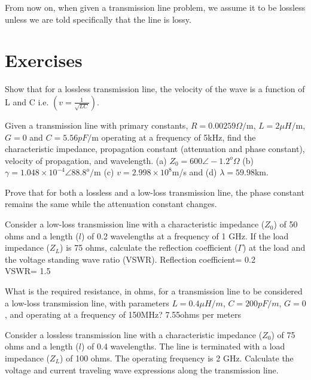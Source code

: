 From now on, when given a transmission line problem, we assume it to be lossless unless we are told specifically that the line is lossy.

\section*{Exercises}
\begin{ExerciseList}
\Exercise[label={ex41}]
Show that for a lossless transmission line, the velocity of the wave is a function of L and C i.e. $\left(v = \frac{1}{\sqrt{LC}}\right)$.

\Exercise[label={ex42}]
Given a transmission line with primary constants, $R = 0.00259\varOmega/$m, $L = 2\mu H/$m, $G = 0$ and $C = 5.56pF/$m operating at a frequency of 5kHz, find the characteristic impedance, propagation constant (attenuation and phase constant), velocity of propagation, and wavelength.
\Answer[ref={ex42}]
(a) $Z_0 = 600\angle-1.2^o\varOmega$ (b) $\gamma = 1.048\times10^{-4}\angle88.8^o/$m (c) $v = 2.998\times10^8$m/s and (d) $\lambda = 59.98$km.

\Exercise[label={ex43}]
Prove that for both a lossless and a low-loss transmission line, the phase constant remains the same while the attenuation constant changes.

\Exercise[label={ex44}]
Consider a low-loss transmission line with a characteristic impedance ($Z_0$) of 50 ohms and a length ($l$) of 0.2 wavelengths at a frequency of 1 GHz. If the load impedance ($Z_L$) is 75 ohms, calculate the reflection coefficient ($\Gamma$) at the load and the voltage standing wave ratio (VSWR).
\Answer[ref={ex44}]
Reflection coefficient=  0.2 \\
VSWR= 1.5

\Exercise[label={ex45}]
What is the required resistance, in ohms, for a transmission line to be considered a low-loss transmission line, with parameters $L=0.4\mu H/m$, $C=200pF/m$, $G=0$, and operating at a frequency of 150MHz?
\Answer[ref={ex45}]
7.55ohms per meters

\Exercise[label={ex46}]
Consider a lossless transmission line with a characteristic impedance ($Z_0$) of 75 ohms and a length ($l$) of 0.4 wavelengths. The line is terminated with a load impedance ($Z_L$) of 100 ohms. The operating frequency is 2 GHz.
Calculate the voltage and current traveling wave expressions along the transmission line.


\end{ExerciseList}
